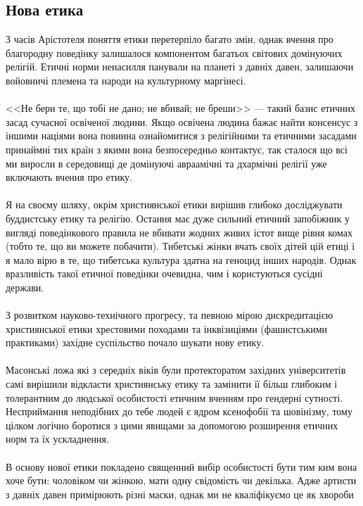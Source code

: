 \subsection{Нова етика}

З часів Арістотеля поняття етики перетерпіло багато змін, однак вчення про
благородну поведінку залишалося компонентом багатьох світових домінуючих
релігій. Етичні норми ненасилля панували на планеті з давніх давен,
залишаючи войовничі племена та народи на культурному маргінесі.
\\
\\
<<Не бери те, що тобі не дано; не вбивай; не бреши>> --- такий базис
етичних засад сучасної освіченої людини. Якщо освічена людина бажає
найти консенсус з іншими націями вона повинна ознайомитися з релігійними
та етичними засадами принаймні тих країн з якими вона безпосередньо контактує,
так сталося що всі ми виросли в середовищі де домінуючі авраамічні та дхармічні
релігії уже включають вчення про етику.
\\
\\
Я на своєму шляху, окрім християнської етики вирішив глибоко досліджувати
буддистську етику та релігію. Остання має дуже сильний етичний запобіжник
у вигляді поведінкового правила не вбивати жодних живих істот вище рівня
комах (тобто те, що ви можете побачити). Тибетські жінки вчать своїх дітей
цій етиці і я мало вірю в те, що тибетська культура здатна на геноцид інших
народів. Однак вразливість такої етичної поведінки очевидна, чим і користуються сусідні держави.
\\
\\
З розвитком науково-технічного прогресу, та певною мірою дискредитацією
християнської етики хрестовими походами та інквізиціями (фашистськими
практиками) західне суспільство почало шукати нову етику.
\\
\\
Масонські ложа які з середніх віків були протекторатом західних університетів
самі вирішили відкласти християнську етику та замінити її більш глибоким і
толерантним до людської особистості етичним вченням про гендерні сутності.
Несприймання неподібних до тебе людей є ядром ксенофобії та шовінізму, тому
цілком логічно боротися з цими явищами за допомогою розширення етичних норм
та їх ускладнення.
\\
\\
В основу нової етики покладено священний вибір особистості бути тим ким вона
хоче бути: чоловіком чи жінкою, мати одну свідомість чи декілька. Адже артисти
з давніх давен примірюють різні маски, однак ми не кваліфікуємо це як хвороби
